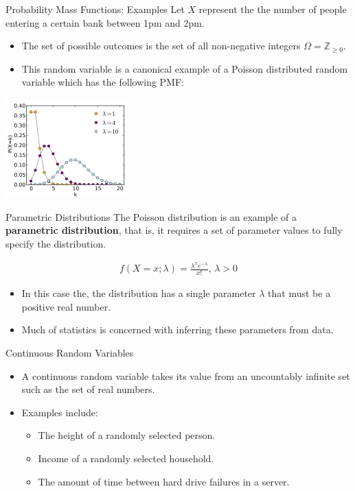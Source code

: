 \documentclass[serif,xcolor=pdftex,dvipsnames,table,hyperref={bookmarks=false,breaklinks}]{beamer}
\begin{document}
\begin{frame}[t]{Probability Mass Functions: Examples}
	Let $X$ represent the the number of people entering a certain bank between 1pm and 2pm.
	\begin{itemize}[<+->]
		\item The set of possible outcomes is the set of all non-negative integers $\Omega = \mathbb{Z}_{\geq 0}$.
		\item This random variable is a canonical example of a Poisson distributed random variable which has the following PMF:
	\end{itemize}
	\pause
	\centering
	\includegraphics[height=1.5in]{../Figures/Poisson_pmf.png}
\end{frame}

\begin{frame}[t]{Parametric Distributions}
	The Poisson distribution is an example of a \textbf{parametric distribution}, that is, it requires a set of parameter values to fully specify the distribution.
	
	\pause
	\begin{align*}
		f(X=x; \lambda) = \frac{\lambda^x e^{-\lambda}}{x!},\, \lambda > 0
	\end{align*}
	
	\pause
	\begin{itemize}[<+->]
		\item In this case the, the distribution has a single parameter $\lambda$ that must be a positive real number. 
		\item Much of statistics is concerned with inferring these parameters from data.
	\end{itemize}
\end{frame}

\begin{frame}[t]{Continuous Random Variables}
	\begin{itemize}[<+->]
		\item A continuous random variable takes its value from an uncountably infinite set such as the set of real numbers. 
		\item Examples include:
		\begin{itemize}[<+->]
			\item The height of a randomly selected person.
			\item Income of a randomly selected household.
			\item The amount of time between hard drive failures in a server.
		\end{itemize}
	\end{itemize}
\end{frame}
\end{document}
